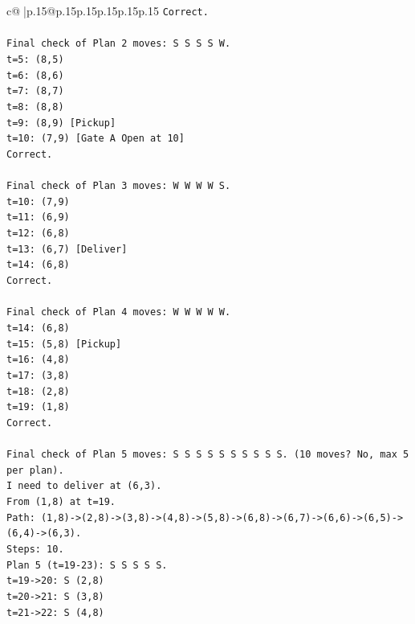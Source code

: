 \documentclass{article}
\begin{document}
{\begin{supertabular}{c@{$\;$}|p{.15\linewidth}@{}p{.15\linewidth}p{.15\linewidth}p{.15\linewidth}p{.15\linewidth}p{.15\linewidth}}
{{{\texttt{Correct.} \\
\\ 
\texttt{Final check of Plan 2 moves: S S S S W.} \\
\texttt{t=5: (8,5)} \\
\texttt{t=6: (8,6)} \\
\texttt{t=7: (8,7)} \\
\texttt{t=8: (8,8)} \\
\texttt{t=9: (8,9) {[}Pickup{]}} \\
\texttt{t=10: (7,9) {[}Gate A Open at 10{]}} \\
\texttt{Correct.} \\
\\ 
\texttt{Final check of Plan 3 moves: W W W W S.} \\
\texttt{t=10: (7,9)} \\
\texttt{t=11: (6,9)} \\
\texttt{t=12: (6,8)} \\
\texttt{t=13: (6,7) {[}Deliver{]}} \\
\texttt{t=14: (6,8)} \\
\texttt{Correct.} \\
\\ 
\texttt{Final check of Plan 4 moves: W W W W W.} \\
\texttt{t=14: (6,8)} \\
\texttt{t=15: (5,8) {[}Pickup{]}} \\
\texttt{t=16: (4,8)} \\
\texttt{t=17: (3,8)} \\
\texttt{t=18: (2,8)} \\
\texttt{t=19: (1,8)} \\
\texttt{Correct.} \\
\\ 
\texttt{Final check of Plan 5 moves: S S S S S S S S S S. (10 moves? No, max 5 per plan).} \\
\texttt{I need to deliver at (6,3).} \\
\texttt{From (1,8) at t=19.} \\
\texttt{Path: (1,8){-}>(2,8){-}>(3,8){-}>(4,8){-}>(5,8){-}>(6,8){-}>(6,7){-}>(6,6){-}>(6,5){-}>(6,4){-}>(6,3).} \\
\texttt{Steps: 10.} \\
\texttt{Plan 5 (t=19{-}23): S S S S S.} \\
\texttt{t=19{-}>20: S (2,8)} \\
\texttt{t=20{-}>21: S (3,8)} \\
\texttt{t=21{-}>22: S (4,8)} \\
}}}
\end{supertabular}}
\end{document}
